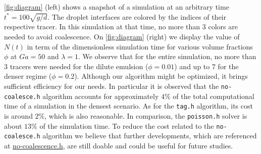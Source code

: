 \ref{fig:diagram} (left) shows a snapshot of a simulation at an arbitrary time $t^* = 100 \sqrt{g/d}$. 
The droplet interfaces are colored by the indices of their respective tracer. 
In this simulation at that time, no more than 3 colors are needed to avoid coalescence.
On \ref{fig:diagram} (right) we display the value of $N(t)$ in term of the dimensionless simulation time for various volume fractions $\phi$ at $Ga = 50$ and  $\lambda = 1$. 
We observe that for the entire simulation, no more than 3 tracers were needed for the dilute emulsion ($\phi = 0.01$) and up to 7 for the denser regime ($\phi = 0.2$). 
Although our algorithm might be optimized, it brings sufficient efficiency for our needs. 
In particular it is observed that the \texttt{no-coalesce.h} algorithm accounts for approximately $4\%$ of the total computational time of a simulation in the densest scenario. As for the \texttt{tag.h} algorithm, its cost is around $2\%$, which is also reasonable. In comparison, the \texttt{poisson.h} solver is about $13\%$ of the simulation time. 
To reduce the cost related to the \texttt{no-coalesce.h} algorithm we believe that further developments, which are referenced at \href{http://basilisk.fr/sandbox/fintzin/Rising-Suspenion/no-coalescence.h}{no-coalescence.h}, are still doable and could be useful for future studies.

